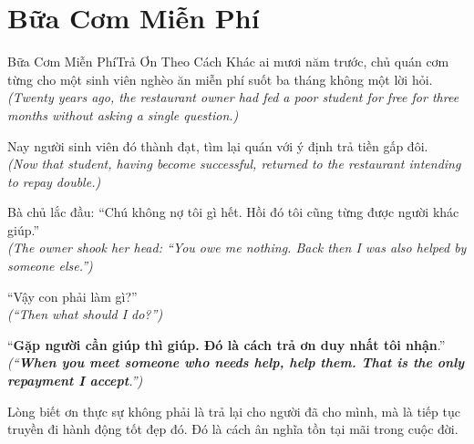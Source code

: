 \section{Bữa Cơm Miễn Phí}
\begin{truyen}{Bữa Cơm Miễn Phí}{Trả Ơn Theo Cách Khác}
ai mươi năm trước, chủ quán cơm từng cho một sinh viên nghèo ăn miễn phí suốt ba tháng không một lời hỏi.\\
\textit{(Twenty years ago, the restaurant owner had fed a poor student for free for three months without asking a single question.)}

Nay người sinh viên đó thành đạt, tìm lại quán với ý định trả tiền gấp đôi.\\
\textit{(Now that student, having become successful, returned to the restaurant intending to repay double.)}

Bà chủ lắc đầu: ``Chú không nợ tôi gì hết. Hồi đó tôi cũng từng được người khác giúp.''\\
\textit{(The owner shook her head: ``You owe me nothing. Back then I was also helped by someone else.'')}

``Vậy con phải làm gì?''\\
\textit{(``Then what should I do?'')}

``\textbf{Gặp người cần giúp thì giúp. Đó là cách trả ơn duy nhất tôi nhận}.''\\
\textit{(``\textbf{When you meet someone who needs help, help them. That is the only repayment I accept}.'')}
\end{truyen}
\begin{baihoc}
  Lòng biết ơn thực sự không phải là trả lại cho người đã cho mình, mà là tiếp tục truyền đi hành động tốt đẹp đó. Đó là cách ân nghĩa tồn tại mãi trong cuộc đời.
\end{baihoc}

